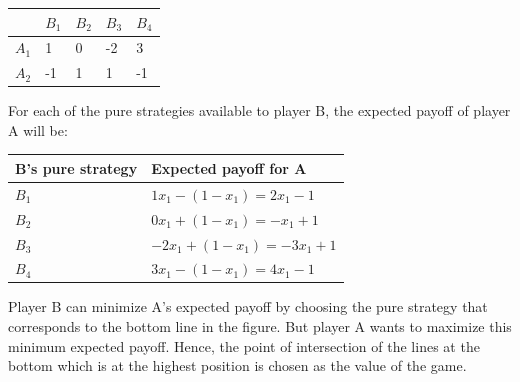 \documentclass[12pt]{article}
\begin{document}
\begin{center}
  \begin{tabular}{|l|l|l|l|l|}
    \hline
    & $B_1$ & $B_2$ & $B_3$ & $B_4$ \\
    \hline
    $A_1$ & 1     & 0     & -2    & 3     \\ 
    $A_2$ & -1    & 1     & 1     & -1    \\ 
    \hline
  \end{tabular}
\end{center}
For each of the pure strategies available to player B, the expected payoff of player A will be:
\begin{center}
  \begin{tabular}{|l|l|}
    \hline
    \textbf{B's pure strategy} & \textbf{Expected payoff for A}             \\
    \hline
    $B_1$                      & $1 x_1 -\left(1-x_1\right) = 2x_1-1      $ \\
    $B_2$                      & $0 x_1 +\left(1-x_1\right) = -x_1+1      $ \\
    $B_3$                      & $-2 x_1 +  \left(1-x_1\right) = -3 x_1+1 $ \\
    $B_4$                      & $3 x_1 - \left(1-x_1\right) = 4 x_1 - 1  $ \\
    \hline
  \end{tabular}
\end{center}
Player B can minimize A's expected payoff by choosing the pure strategy that corresponds to the bottom line in the figure. But player A wants to maximize this minimum expected payoff. Hence, the point of intersection of the lines at the bottom which is at the highest position is chosen as the value of the game.
\end{document}

